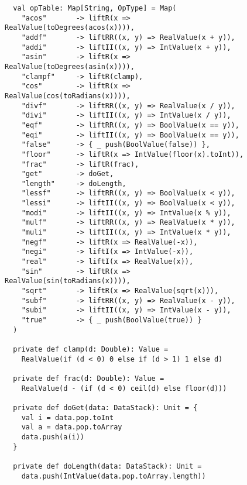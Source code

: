\begin{figure}
\begin{verbatim}
  val opTable: Map[String, OpType] = Map(
    "acos"       -> liftR(x => RealValue(toDegrees(acos(x)))),
    "addf"       -> liftRR((x, y) => RealValue(x + y)),
    "addi"       -> liftII((x, y) => IntValue(x + y)),
    "asin"       -> liftR(x => RealValue(toDegrees(asin(x)))),
    "clampf"     -> liftR(clamp),
    "cos"        -> liftR(x => RealValue(cos(toRadians(x)))),
    "divf"       -> liftRR((x, y) => RealValue(x / y)),
    "divi"       -> liftII((x, y) => IntValue(x / y)),
    "eqf"        -> liftRR((x, y) => BoolValue(x == y)),
    "eqi"        -> liftII((x, y) => BoolValue(x == y)),
    "false"      -> { _ push(BoolValue(false)) },
    "floor"      -> liftR(x => IntValue(floor(x).toInt)),
    "frac"       -> liftR(frac),
    "get"        -> doGet,
    "length"     -> doLength,
    "lessf"      -> liftRR((x, y) => BoolValue(x < y)),
    "lessi"      -> liftII((x, y) => BoolValue(x < y)),
    "modi"       -> liftII((x, y) => IntValue(x % y)),
    "mulf"       -> liftRR((x, y) => RealValue(x * y)),
    "muli"       -> liftII((x, y) => IntValue(x * y)),
    "negf"       -> liftR(x => RealValue(-x)),
    "negi"       -> liftI(x => IntValue(-x)),
    "real"       -> liftI(x => RealValue(x)),
    "sin"        -> liftR(x => RealValue(sin(toRadians(x)))),
    "sqrt"       -> liftR(x => RealValue(sqrt(x))),
    "subf"       -> liftRR((x, y) => RealValue(x - y)),
    "subi"       -> liftII((x, y) => IntValue(x - y)),
    "true"       -> { _ push(BoolValue(true)) }
  )

  private def clamp(d: Double): Value =
    RealValue(if (d < 0) 0 else if (d > 1) 1 else d)

  private def frac(d: Double): Value =
    RealValue(d - (if (d < 0) ceil(d) else floor(d)))

  private def doGet(data: DataStack): Unit = {
    val i = data.pop.toInt
    val a = data.pop.toArray
    data.push(a(i))
  }

  private def doLength(data: DataStack): Unit =
    data.push(IntValue(data.pop.toArray.length))
\end{verbatim}
\getcaption
\end{figure}

